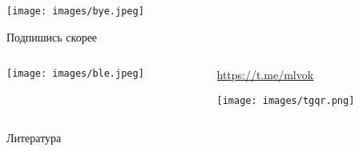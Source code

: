 \documentclass[11pt,aspectratio=169,handout]{beamer}
\begin{document}
\begin{frame}
\begin{center}
\texttt{[image: images/bye.jpeg]}
\end{center}
\end{frame}

\begin{frame}{Подпишись скорее}

\begin{columns}
\begin{column}{0.45\textwidth}
   \begin{center}
                \texttt{[image: images/ble.jpeg]}
   \end{center}
\end{column}
\begin{column}{0.45\textwidth}
   \begin{center}
                \url{https://t.me/mlvok}

                \texttt{[image: images/tgqr.png]}
   \end{center}
\end{column}
\end{columns}

\end{frame}

\begin{frame}[allowframebreaks]{Литература}




\end{frame}
\end{document}
